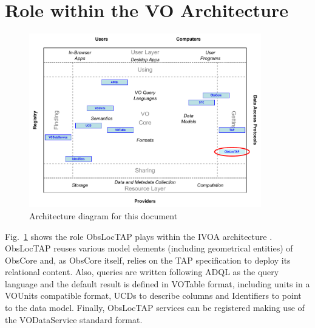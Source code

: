 \documentclass[11pt,a4paper]{ivoa}
\begin{document}
\section*{Role within the VO Architecture}


\begin{figure}
\centering


\includegraphics[width=0.9\textwidth]{role_diagram.pdf}
\caption{Architecture diagram for this document}
\label{fig:archdiag}
\end{figure}


Fig.~\ref{fig:archdiag} shows the role ObsLocTAP plays within the
IVOA architecture \citep{note:VOARCH}. ObsLocTAP reuses various model elements (including geometrical entities) of ObsCore and, 
as ObsCore itself, relies on the TAP specification to deploy its relational content.
Also, queries are written following ADQL as the query language and the default result is defined
in VOTable format, including units in a VOUnits compatible format, UCDs to
describe columns and Identifiers to point to the data model. Finally, ObsLocTAP
services can be registered making use of the VODataService standard format.
\end{document}
